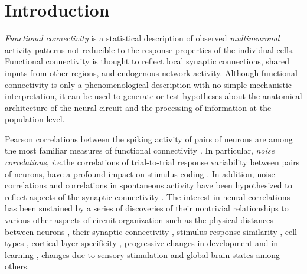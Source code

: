 \documentclass[10pt]{article}
\newcommand{\ie}{\emph{i.e.}\;}
\begin{document}
\section*{Introduction}
\emph{Functional connectivity} is a statistical description of observed \emph{multineuronal} activity patterns not reducible to the response properties of the individual cells. Functional connectivity is thought to reflect local synaptic connections, shared inputs from other regions, and endogenous network activity.  Although functional connectivity is only a phenomenological description with no simple mechanistic interpretation, it can be used to generate or test hypotheses about the anatomical architecture of the neural circuit and the processing of information at the population level.

Pearson correlations between the spiking activity of pairs of neurons are among the most familiar measures of functional connectivity \cite{Averbeck:2006, Zohary:1994, Kohn:2005, Bair:2001, Ecker:2010}.  In particular, \emph{noise correlations}, \ie the correlations of trial-to-trial response variability between pairs of neurons, have a profound impact on stimulus coding \cite{Zohary:1994, Abbott:1999, Sompolinsky:2001, Nirenberg:2003, Averbeck:2006, Josic:2009, Berens:2011, Ecker:2011}. In addition, noise correlations and correlations in spontaneous activity have been hypothesized to reflect aspects of the synaptic connectivity \cite{Gerstein:1964}.  The interest in neural correlations has been sustained by a series of discoveries of their nontrivial relationships to various other aspects of circuit organization such as the physical distances between neurons \cite{Smith:2008, Denman:2013}, their synaptic connectivity \cite{Ko:2011},  stimulus response similarity \cite{Bair:2001, Arieli:1995, Chiu:2002, Kenet:2003, Kohn:2005, Cohen:2008, Cohen:2009, Ecker:2010, Rothschild:2010, Ko:2011, Smith:2013b}, cell types \cite{Hofer:2011}, cortical layer specificity \cite{Hansen:2012, Smith:2013}, progressive changes in development and in learning \cite{Golshani:2009, Gu:2011}, changes due to sensory stimulation and global brain states \cite{Greenberg:2008, Goard:2009, Kohn:2009, Rothschild:2010, Ecker:2010, Renart:2010} among others. 
\end{document}

